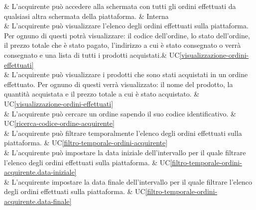  & L'acquirente può accedere alla schermata con tutti gli ordini effettuati da qualsiasi altra schermata della piattaforma. & Interna \\

 & L'acquirente può visualizzare l'elenco degli ordini effettuati sulla piattaforma. Per ognuno di questi potrà visualizzare: il codice dell'ordine, lo stato dell'ordine, il prezzo totale che è stato pagato, l'indirizzo a cui è stato consegnato o verrà consegnato e una lista di tutti i prodotti acquistati.& UC\ref{visualizzazione-ordini-effettuati} \\

 & L'acquirente può visualizzare i prodotti che sono stati acquistati in un ordine effettuato. Per ognuno di questi verrà visualizzato: il nome del prodotto, la quantità acquistata e il prezzo totale a cui è stato acquistato. & UC\ref{visualizzazione-ordini-effettuati} \\

 & L'acquirente può cercare un ordine sapendo il suo codice identificativo. & UC\ref{ricerca-codice-ordine-acquirente} \\

 & L'acquirente può filtrare temporalmente l'elenco degli ordini effettuati sulla piattaforma. & UC\ref{filtro-temporale-ordini-acquirente} \\

 & L'acquirente può impostare la data iniziale dell'intervallo per il quale filtrare l'elenco degli ordini effettuati sulla piattaforma. & UC\ref{filtro-temporale-ordini-acquirente.data-iniziale} \\

 & L'acquirente impostare la data finale dell'intervallo per il quale filtrare l'elenco degli ordini effettuati sulla piattaforma. & UC\ref{filtro-temporale-ordini-acquirente.data-finale} \\

